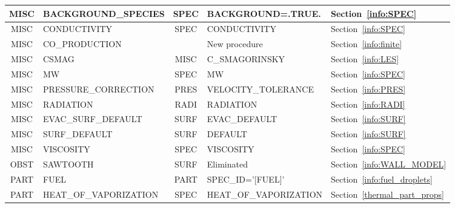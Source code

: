 \documentclass[11pt]{book}
\begin{document}
\begin{table}
\begin{tabular}{@{\extracolsep{\fill}}|c|l|c|l|l|}
{\ct MISC}    & {\ct BACKGROUND\_SPECIES}           &  {\ct SPEC}  & {\ct BACKGROUND=.TRUE.}                     & Section~\ref{info:SPEC}                  \\ \hline
{\ct MISC}    & {\ct CONDUCTIVITY}                  &  {\ct SPEC}  & {\ct CONDUCTIVITY}                          & Section~\ref{info:SPEC}                  \\ \hline
{\ct MISC}    & {\ct CO\_PRODUCTION}                &              & New procedure                               & Section~\ref{info:finite}                \\ \hline
{\ct MISC}    & {\ct CSMAG}                         &  {\ct MISC}  & {\ct C\_SMAGORINSKY}                        & Section~\ref{info:LES}                   \\ \hline
{\ct MISC}    & {\ct MW}                            &  {\ct SPEC}  & {\ct MW}                                    & Section~\ref{info:SPEC}                  \\ \hline
{\ct MISC}    & {\ct PRESSURE\_CORRECTION}          &  {\ct PRES}  & {\ct VELOCITY\_TOLERANCE}                   & Section~\ref{info:PRES}                  \\ \hline
{\ct MISC}    & {\ct RADIATION}                     &  {\ct RADI}  & {\ct RADIATION}                             & Section~\ref{info:RADI}                  \\ \hline
{\ct MISC}    & {\ct EVAC\_SURF\_DEFAULT}           &  {\ct SURF}  & {\ct EVAC\_DEFAULT}                         & Section~\ref{info:SURF}                  \\ \hline
{\ct MISC}    & {\ct SURF\_DEFAULT}                 &  {\ct SURF}  & {\ct DEFAULT}                               & Section~\ref{info:SURF}                  \\ \hline
{\ct MISC}    & {\ct VISCOSITY}                     &  {\ct SPEC}  &  {\ct VISCOSITY}                            & Section~\ref{info:SPEC}                  \\ \hline
{\ct OBST}    & {\ct SAWTOOTH}                      &  {\ct SURF}  & Eliminated                                  & Section~\ref{info:WALL_MODEL}            \\ \hline
{\ct PART}    & {\ct FUEL}                          &  {\ct PART}  & {\ct SPEC\_ID='[FUEL]'}                     & Section~\ref{info:fuel_droplets}         \\ \hline
{\ct PART}    & {\ct HEAT\_OF\_VAPORIZATION}        &  {\ct SPEC}  &  {\ct HEAT\_OF\_VAPORIZATION}               & Section~\ref{thermal_part_props}         \\ \hline

\end{tabular}
\end{table}
\end{document}
